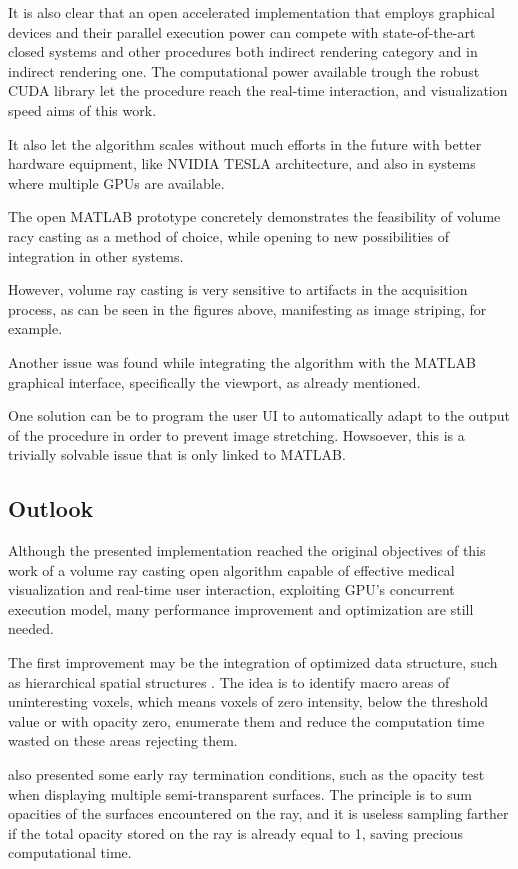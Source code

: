 \documentclass[12pt,a4paper]{extarticle}
\newcommand{\linespace}{\vspace{0pt}}
\begin{document}
It is also clear that an open accelerated implementation that employs graphical devices and their parallel execution power can compete with state-of-the-art closed systems and other procedures both indirect rendering category and in indirect rendering one.
The computational power available trough the robust CUDA library let the procedure reach the real-time interaction, and visualization speed aims of this work.

It also let the algorithm scales without much efforts in the future with better hardware equipment, like NVIDIA TESLA architecture, and also in systems where multiple GPUs are available. 
\linespace

The open MATLAB prototype concretely demonstrates the feasibility of volume racy casting as a method of choice, while opening to new possibilities of integration in other systems.
\linespace

However, volume ray casting is very sensitive to artifacts in the acquisition process, as can be seen in the figures above, manifesting as image striping, for example. 
\linespace

Another issue was found while integrating the algorithm with the MATLAB graphical interface, specifically the viewport, as already mentioned.

One solution can be to program the user UI to automatically adapt to the output of the procedure in order to prevent image stretching. Howsoever, this is a trivially solvable issue that is only linked to MATLAB.
\subsection{Outlook}
Although the presented implementation reached the original objectives of this work of a volume ray casting open algorithm capable of effective medical visualization and real-time user interaction, exploiting GPU's concurrent execution model, many performance improvement and optimization are still needed.
\linespace

The first improvement may be the integration of optimized data structure, such as hierarchical spatial structures \cite{levoy_1990:5}. The idea is to identify macro areas of uninteresting voxels, which means voxels of zero intensity, below the threshold value or with opacity zero, enumerate them and reduce the computation time wasted on these areas rejecting them.

\cite{levoy_1990:5} also presented some early ray termination conditions, such as the opacity test when displaying multiple semi-transparent surfaces. The principle is to sum opacities of the surfaces encountered on the ray, and it is useless sampling farther if the total opacity stored on the ray is already equal to 1, saving precious computational time.
\linespace
\end{document}
